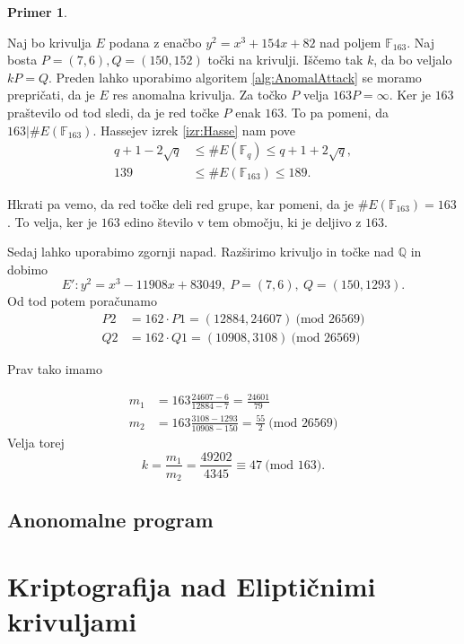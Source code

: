 \documentclass[12pt,a4paper,twoside]{article}
\theoremstyle{definition} %
\newtheorem{primer}[definicija]{Primer}
\theoremstyle{plain} %
\numberwithin{equation}{section}  %
\newcommand{\Q}{\mathbb Q}
\newcommand{\F}{\mathbb F}
\newcommand{\E}[1]{E({#1})}
\newcommand{\MOD}[1]{\ \text{(mod }{#1}\text{)}}
\begin{document}
\begin{primer}~

Naj bo krivulja $E$ podana z enačbo $y^2=x^3+154x+82$ nad poljem $\F_{163}$. Naj bosta $P = (7,6),Q = (150,152)$ točki na krivulji. Iščemo tak $k$, da bo veljalo $kP=Q$. Preden lahko uporabimo algoritem \ref{alg:AnomalAttack} se moramo prepričati, da je $E$ res anomalna krivulja. Za točko $P$ velja $163P = \infty$. Ker je $163$ praštevilo od tod sledi, da je red točke $P$ enak $163$. To pa pomeni, da $163|\#\E{\F_{163}}$. Hassejev izrek \ref{izr:Hasse} nam pove 
\begin{align}
q+1-2\sqrt{q} &{}\leq \#\E{\F_q} \leq q+1+2\sqrt{q}, \nonumber \\
139 &{}\leq \#\E{\F_{163}} \leq 189. \nonumber
\end{align}

Hkrati pa vemo, da red točke deli red grupe, kar pomeni, da je $\#\E{\F_{163}} = 163$. To velja, ker je $163$ edino število v tem območju, ki je deljivo z $163$.

Sedaj lahko uporabimo zgornji napad. Razširimo krivuljo in točke nad $\Q$ in dobimo
$$E': y^2 = x^3-11908x+83049, \ P =(7,6), \ Q=(150,1293).$$
Od tod potem poračunamo
\begin{align}
P2 &{}= 162\cdot P1 = (12884,24607) \MOD{26569} \nonumber \\
Q2 &{}= 162\cdot Q1 = (10908,3108) \MOD{26569} \nonumber
\end{align}

Prav tako imamo

\begin{align}
m_1 &{}= 163\frac{24607-6}{12884-7} = \frac{24601}{79} \nonumber \\
m_2 &{}= 163\frac{3108-1293}{10908-150} = \frac{55}{2} \MOD{26569} \nonumber
\end{align}
 Velja torej
$$k = \frac{m_1}{m_2} = \frac{49202}{4345} \equiv 47 \MOD{163}.$$
\end{primer}

\subsection{Anonomalne program}



\newpage

\section{Kriptografija nad Eliptičnimi krivuljami}
\end{document}
